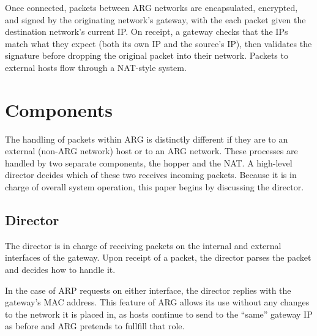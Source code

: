 \par Once connected, packets between ARG networks are encapsulated, encrypted, and signed by the originating network's gateway, with the each packet given the destination network's current IP. On receipt, a gateway checks that the IPs match what they expect (both its own IP and the source's IP), then validates the signature before dropping the original packet into their network. Packets to external hosts flow through a \ac{NAT}-style system. %


\section{Components}
\label{sec:arg_components}
The handling of packets within ARG is distinctly different if they are to an external (non-ARG network) host or to an ARG network. These processes are handled by two separate components, the hopper and the NAT. A high-level director decides which of these two receives incoming packets. Because it is in charge of overall system operation, this paper begins by discussing the director.

\subsection{Director}
\label{sec:arg_director}
\par The director is in charge of receiving packets on the internal and external interfaces of the gateway. Upon receipt of a packet, the director parses the packet and decides how to handle it. 

\par In the case of \ac{ARP} requests on either interface, the director replies with the gateway's \ac{MAC} address. This feature of \ac{ARG} allows its use without any changes to the network it is placed in, as hosts continue to send to the ``same'' gateway IP as before and \ac{ARG} pretends to fullfill that role. 

